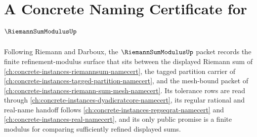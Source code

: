 \chapter{A Concrete Naming Certificate for $\RiemannSumModulusUp$}
\label{ch:concrete-instances-riemann-sum-modulus-namecert}

Following Riemann and Darboux, the $\RiemannSumModulusUp$ packet records the finite refinement-modulus surface that sits between the displayed Riemann sum of \autoref{ch:concrete-instances-riemannsum-namecert}, the tagged partition carrier of \autoref{ch:concrete-instances-tagged-partition-namecert}, and the mesh-bound packet of \autoref{ch:concrete-instances-riemann-sum-mesh-namecert}. Its tolerance rows are read through \autoref{ch:concrete-instances-dyadicratcore-namecert}, its regular rational and real-name handoff follows \autoref{ch:concrete-instances-regseqrat-namecert} and \autoref{ch:concrete-instances-real-namecert}, and its only public promise is a finite modulus for comparing sufficiently refined displayed sums.

